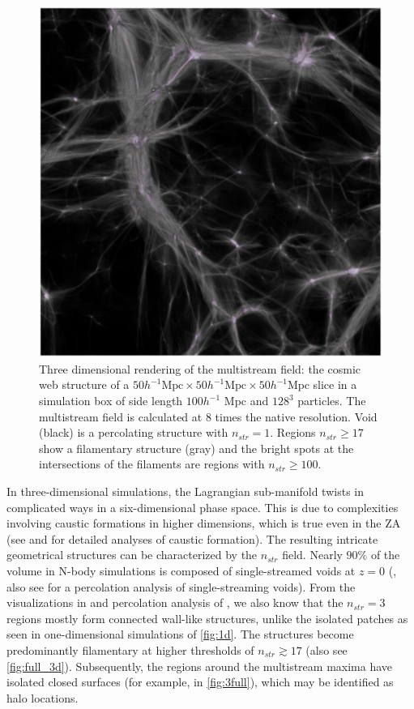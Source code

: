 \begin{figure} 
\centering\includegraphics[width=16cm]{Chapter4/Source_v2/fig1.pdf} 
\caption{Three dimensional rendering of the multistream field: the cosmic web structure of a $ 50 h^{-1} \text{Mpc} \times 50 h^{-1} \text{Mpc} \times 50 h^{-1} \text{Mpc}$ slice in a simulation box of side length $100 h^{-1}$ Mpc and $128^3$ particles. The multistream field is calculated at 8 times the native resolution. Void (black) is a percolating structure with $n_{str} = 1$. Regions $n_{str} \geq 17$ show a filamentary structure (gray) and the bright spots at the intersections of the filaments are regions with $n_{str} \geq 100$. }
\label{fig:full_3d}
\end{figure}

In three-dimensional simulations, the Lagrangian sub-manifold twists in complicated ways in a six-dimensional phase space. This is due to complexities involving caustic formations in higher dimensions, which is true even in the ZA (see \citealt{Arnold1982} and \citealt{Hidding2014} for detailed analyses of caustic formation). The resulting intricate geometrical structures can be characterized by the $n_{str}$ field. Nearly  $90\%$ of the volume in N-body simulations is composed of single-streamed voids at $z=0$ (\citealt{Shandarin2012}, also see \citealt{Falck2015} for a percolation analysis of single-streaming voids). From the visualizations in \cite{Ramachandra2015} and percolation analysis of \cite{Ramachandra2017}, we also know that the $n_{str} = 3$ regions mostly form connected wall-like structures, unlike the isolated patches as seen in one-dimensional simulations of \autoref{fig:1d}. The structures become predominantly filamentary at higher thresholds of $ n_{str} \gtrsim 17$ (also see \autoref{fig:full_3d}). Subsequently, the regions around the multistream maxima have isolated closed surfaces (for example, in \autoref{fig:3full}), which may be identified as halo locations. 



